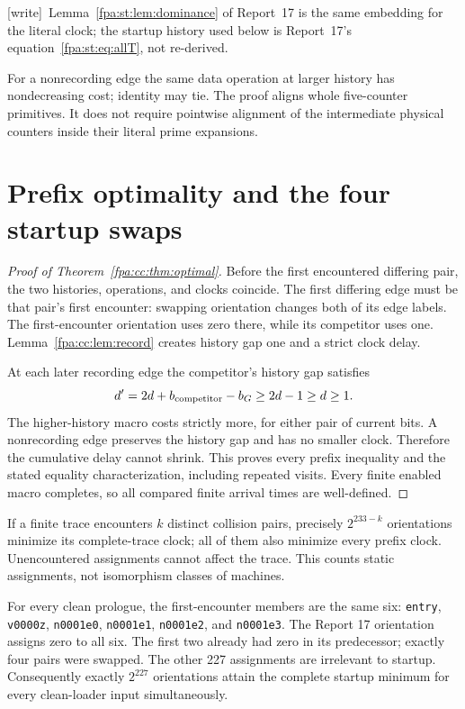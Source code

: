\documentclass[11pt,a4paper]{article}
\numberwithin{equation}{section}
\newcommand{\code}[1]{\texttt{\small #1}}
\newcommand{\wtag}{\textup{[write]}}
\begin{document}
\wtag\ Lemma~\ref{fpa:st:lem:dominance} of Report~17 is the same embedding for the literal clock; the startup history used below is Report~17's equation~\eqref{fpa:st:eq:allT}, not re-derived.

For a nonrecording edge the same data operation at larger history has
nondecreasing cost; identity may tie. The proof aligns whole five-counter
primitives. It does not require pointwise alignment of the intermediate
physical counters inside their literal prime expansions.
\newpage

\section{Prefix optimality and the four startup swaps}
\label{fpa:cc:sec:prefix}
\begin{proof}[Proof of Theorem~\ref{fpa:cc:thm:optimal}]
Before the first encountered differing pair, the two histories, operations,
and clocks coincide. The first differing edge must be that pair's first
encounter: swapping orientation changes both of its edge labels. The
first-encounter orientation uses zero there, while its competitor uses one.
Lemma~\ref{fpa:cc:lem:record} creates history gap one and a strict clock delay.

At each later recording edge the competitor's history gap satisfies
\begin{equation}
 d'=2d+b_{\rm competitor}-b_G\geq2d-1\geq d\geq1.
 \label{fpa:cc:eq:gap}
\end{equation}
The higher-history macro costs strictly more, for either pair of current
bits. A nonrecording edge preserves the history gap and has no smaller
clock. Therefore the cumulative delay cannot shrink. This proves every
prefix inequality and the stated equality characterization, including
repeated visits. Every finite enabled macro completes, so all compared
finite arrival times are well-defined.
\end{proof}

If a finite trace encounters $k$ distinct collision pairs, precisely
$2^{233-k}$ orientations minimize its complete-trace clock; all of them
also minimize every prefix clock. Unencountered assignments cannot affect
the trace. This counts static assignments, not isomorphism classes of
machines.

For every clean prologue, the first-encounter members are the same six:
\code{entry}, \code{v0000z}, \code{n0001e0}, \code{n0001e1},
\code{n0001e2}, and \code{n0001e3}. The Report 17 orientation assigns zero
to all six. The first two already had zero in its predecessor; exactly four
pairs were swapped. The other 227 assignments are irrelevant to startup.
Consequently exactly $2^{227}$ orientations attain the complete startup
minimum for every clean-loader input simultaneously.
\end{document}
